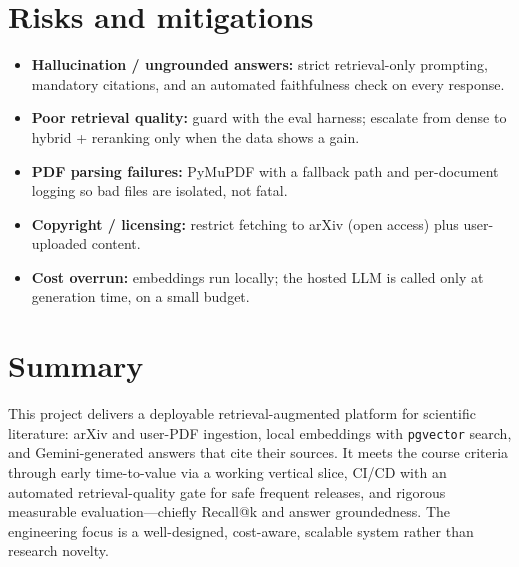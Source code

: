 \documentclass[11pt,a4paper]{article}
\begin{document}
\section{Risks and mitigations}
\begin{itemize}[leftmargin=0.7cm]
    \item \textbf{Hallucination / ungrounded answers:} strict retrieval-only prompting, mandatory citations, and an automated faithfulness check on every response.
    \item \textbf{Poor retrieval quality:} guard with the eval harness; escalate from dense to hybrid + reranking only when the data shows a gain.
    \item \textbf{PDF parsing failures:} PyMuPDF with a fallback path and per-document logging so bad files are isolated, not fatal.
    \item \textbf{Copyright / licensing:} restrict fetching to arXiv (open access) plus user-uploaded content.
    \item \textbf{Cost overrun:} embeddings run locally; the hosted LLM is called only at generation time, on a small budget.
\end{itemize}

\section{Summary}
This project delivers a deployable retrieval-augmented platform for scientific literature: arXiv and user-PDF ingestion, local embeddings with \texttt{pgvector} search, and Gemini-generated answers that cite their sources. It meets the course criteria through early time-to-value via a working vertical slice, CI/CD with an automated retrieval-quality gate for safe frequent releases, and rigorous measurable evaluation---chiefly Recall@k and answer groundedness. The engineering focus is a well-designed, cost-aware, scalable system rather than research novelty.
\end{document}
